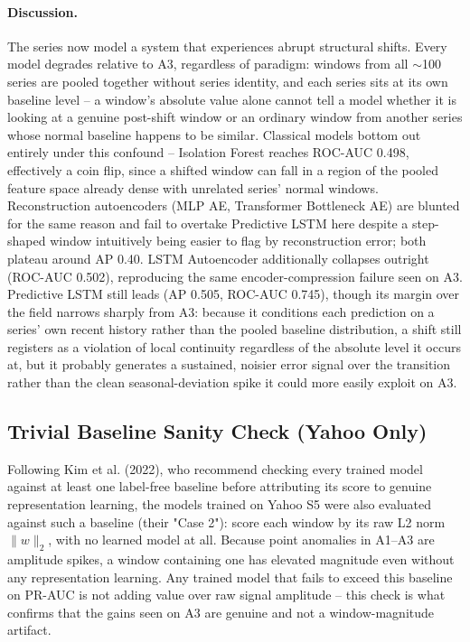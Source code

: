 \paragraph{Discussion.} The series now model a system that experiences abrupt structural shifts.
Every model degrades relative to A3, regardless of paradigm: windows from all $\sim$100 series are pooled together without series identity, and each series sits at its own baseline level -- a window's absolute value alone cannot tell a model whether it is looking at a genuine post-shift window or an ordinary window from another series whose normal baseline happens to be similar. Classical models bottom out entirely under this confound -- Isolation Forest reaches ROC-AUC 0.498, effectively a coin flip, since a shifted window can fall in a region of the pooled feature space already dense with unrelated series' normal windows. Reconstruction autoencoders (MLP AE, Transformer Bottleneck AE) are blunted for the same reason and fail to overtake Predictive LSTM here despite a step-shaped window intuitively being easier to flag by reconstruction error; both plateau around AP 0.40. LSTM Autoencoder additionally collapses outright (ROC-AUC 0.502), reproducing the same encoder-compression failure seen on A3. Predictive LSTM still leads (AP 0.505, ROC-AUC 0.745), though its margin over the field narrows sharply from A3: because it conditions each prediction on a series' own recent history rather than the pooled baseline distribution, a shift still registers as a violation of local continuity regardless of the absolute level it occurs at, but it probably generates a sustained, noisier error signal over the transition rather than the clean seasonal-deviation spike it could more easily exploit on A3.

\subsection{Trivial Baseline Sanity Check (Yahoo Only)}

Following Kim et al. (2022), who recommend checking every trained model against at least one label-free baseline before attributing its score to genuine representation learning, the models trained on Yahoo S5 were also evaluated against such a baseline (their "Case 2"): score each window by its raw L2 norm $\lVert w \rVert_2$, with no learned model at all. Because point anomalies in A1--A3 are amplitude spikes, a window containing one has elevated magnitude even without any representation learning. Any trained model that fails to exceed this baseline on PR-AUC is not adding value over raw signal amplitude -- this check is what confirms that the gains seen on A3 are genuine and not a window-magnitude artifact.

